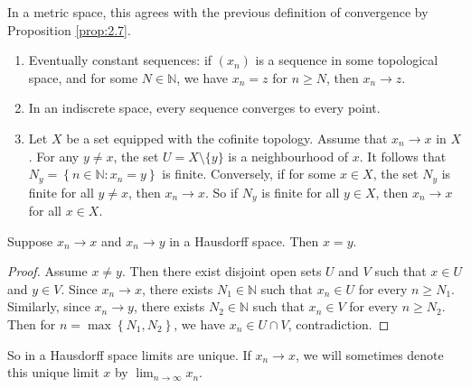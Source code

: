 \documentclass[a4paper]{article}
\begin{document}
\begin{note}
    In a metric space, this agrees with the previous definition of convergence by Proposition \ref{prop:2.7}.
\end{note}

\begin{example}
    \begin{enumerate}
        \item Eventually constant sequences: if $\left(x_{n}\right)$ is a sequence in some topological space, and for some $N \in \mathbb{N}$, we have $x_{n}=z$ for $n \geqslant N$, then $x_{n} \rightarrow z$.
      
        \item In an indiscrete space, every sequence converges to every point.
      
        \item Let $X$ be a set equipped with the cofinite topology. Assume that $x_{n} \rightarrow x$ in $X$. For any $y \neq x$, the set $U=X \setminus \{y\}$ is a neighbourhood of $x$. It follows that $N_{y}=\left\{n \in \mathbb{N}: x_{n}=y\right\}$ is finite. Conversely, if for some $x \in X$, the set $N_{y}$ is finite for all $y \neq x$, then $x_{n} \rightarrow x$. So if $N_{y}$ is finite for all $y \in X$, then $x_{n} \rightarrow x$ for all $x \in X$.
      \end{enumerate}
\end{example}

\begin{proposition}
    Suppose $x_{n} \rightarrow x$ and $x_{n} \rightarrow y$ in a Hausdorff space. Then $x=y$.
\end{proposition}

\begin{proof}
    Assume $x \neq y$. Then there exist disjoint open sets $U$ and $V$ such that $x \in U$ and $y \in V$. Since $x_{n} \rightarrow x$, there exists $N_{1} \in \mathbb{N}$ such that $x_{n} \in U$ for every $n \geqslant N_{1}$. Similarly, since $x_{n} \rightarrow y$, there exists $N_{2} \in \mathbb{N}$ such that $x_{n} \in V$ for every $n \geqslant N_{2}$. Then for $n=\max \left\{N_{1}, N_{2}\right\}$, we have $x_{n} \in U \cap V$, contradiction.
\end{proof}

\begin{remark}
    So in a Hausdorff space limits are unique. If $x_{n} \rightarrow x$, we will sometimes denote this unique limit $x$ by $\lim _{n \rightarrow \infty} x_{n}$.
\end{remark}
\end{document}
